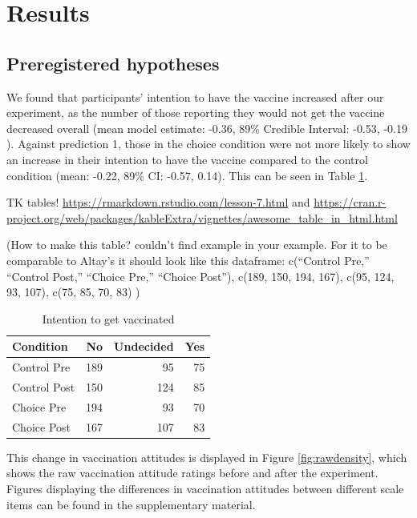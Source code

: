 \documentclass[
  english,
  ,jou,floatsintext]{apa6}
\begin{document}
\hypertarget{results}{%
\section{Results}\label{results}}

\hypertarget{preregistered-hypotheses-1}{%
\subsection{Preregistered hypotheses}\label{preregistered-hypotheses-1}}

We found that participants' intention to have the vaccine increased after our experiment, as the number of those reporting they would not get the vaccine decreased overall (mean model estimate: -0.36, 89\% Credible Interval: -0.53, -0.19 ). Against prediction 1, those in the choice condition were not more likely to show an increase in their intention to have the vaccine compared to the control condition (mean: -0.22, 89\% CI: -0.57, 0.14). This can be seen in Table \ref{tab:intchange}.

TK tables! \url{https://rmarkdown.rstudio.com/lesson-7.html} and \url{https://cran.r-project.org/web/packages/kableExtra/vignettes/awesome_table_in_html.html}

(How to make this table? couldn't find example in your example. For it to be comparable to Altay's it should look like this dataframe: c(``Control Pre,'' ``Control Post,'' ``Choice Pre,'' ``Choice Post''), c(189, 150, 194, 167), c(95, 124, 93, 107), c(75, 85, 70, 83) )

\begin{table}

\caption{\label{tab:intchange}Intention to get vaccinated}
\centering
\begin{tabular}[t]{l|r|r|r}
\hline
Condition & No & Undecided & Yes\\
\hline
Control Pre & 189 & 95 & 75\\
\hline
Control Post & 150 & 124 & 85\\
\hline
Choice Pre & 194 & 93 & 70\\
\hline
Choice Post & 167 & 107 & 83\\
\hline
\end{tabular}
\end{table}

This change in vaccination attitudes is displayed in Figure \ref{fig:rawdensity}, which shows the raw vaccination attitude ratings before and after the experiment. Figures displaying the differences in vaccination attitudes between different scale items can be found in the supplementary material.
\end{document}
